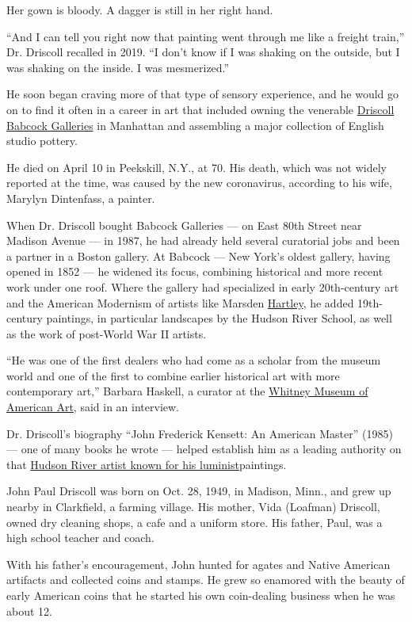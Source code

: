 Her gown is bloody. A dagger is still in her right hand.

``And I can tell you right now that painting went through me like a
freight train,'' Dr. Driscoll recalled in 2019. ``I don't know if I was
shaking on the outside, but I was shaking on the inside. I was
mesmerized.''

He soon began craving more of that type of sensory experience, and he
would go on to find it often in a career in art that included owning the
venerable \href{http://www.driscollbabcock.com/}{Driscoll Babcock
Galleries} in Manhattan and assembling a major collection of English
studio pottery.

He died on April 10 in Peekskill, N.Y., at 70. His death, which was not
widely reported at the time, was caused by the new coronavirus,
according to his wife, Marylyn Dintenfass, a painter.

When Dr. Driscoll bought Babcock Galleries --- on East 80th Street near
Madison Avenue --- in 1987, he had already held several curatorial jobs
and been a partner in a Boston gallery. At Babcock --- New York's oldest
gallery, having opened in 1852 --- he widened its focus, combining
historical and more recent work under one roof. Where the gallery had
specialized in early 20th-century art and the American Modernism of
artists like Marsden
\href{https://www.nga.gov/collection/artist-info.1375.html}{Hartley}, he
added 19th-century paintings, in particular landscapes by the Hudson
River School, as well as the work of post-World War II artists.

``He was one of the first dealers who had come as a scholar from the
museum world and one of the first to combine earlier historical art with
more contemporary art,'' Barbara Haskell, a curator at the
\href{https://whitney.org}{Whitney Museum of American Art}, said in an
interview.

Dr. Driscoll's biography ``John Frederick Kensett: An American Master''
(1985) --- one of many books he wrote --- helped establish him as a
leading authority on that
\href{https://www.metmuseum.org/toah/hd/kens/hd_kens.htm}{Hudson River
artist known for his luminist}paintings.

John Paul Driscoll was born on Oct. 28, 1949, in Madison, Minn., and
grew up nearby in Clarkfield, a farming village. His mother, Vida
(Loafman) Driscoll, owned dry cleaning shops, a cafe and a uniform
store. His father, Paul, was a high school teacher and coach.

With his father's encouragement, John hunted for agates and Native
American artifacts and collected coins and stamps. He grew so enamored
with the beauty of early American coins that he started his own
coin-dealing business when he was about 12.

